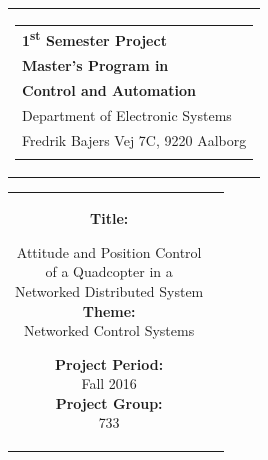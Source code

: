 % 
\begin{nopagebreak}
{\samepage 

\begin{tabular}{r}
\parbox{\textwidth}{  
\hfill \hspace{2cm} \parbox{8cm}{\begin{tabular}{l} %
{\small \textbf{\textcolor{aaublue}{\colorbox{white}{1\textsuperscript{st} Semester Project}}}}\\
{\small \textbf{\textcolor{aaublue}{Master's Program in}}}\\ 
{\small \textbf{\textcolor{aaublue}{Control and Automation}}}\\ 
{\small \textcolor{aaublue}{Department of Electronic Systems}}\\
{\small \textcolor{aaublue}{Fredrik Bajers Vej 7C, 9220 Aalborg}} \\
 \\
\end{tabular}}}
\end{tabular}

\begin{tabular}{cc}
\parbox{7cm}{

\textbf{Title:}

Attitude and Position Control\\ of a Quadcopter in a \\Networked Distributed System \\

\textbf{Theme:} \\
\small{Networked Control Systems
\\
}


\parbox{8cm}{


\textbf{Project Period:}\\
Fall 2016\\
   
\textbf{Project Group:}\\
733\\ %
  
}}
\end{tabular}}
\end{nopagebreak}
